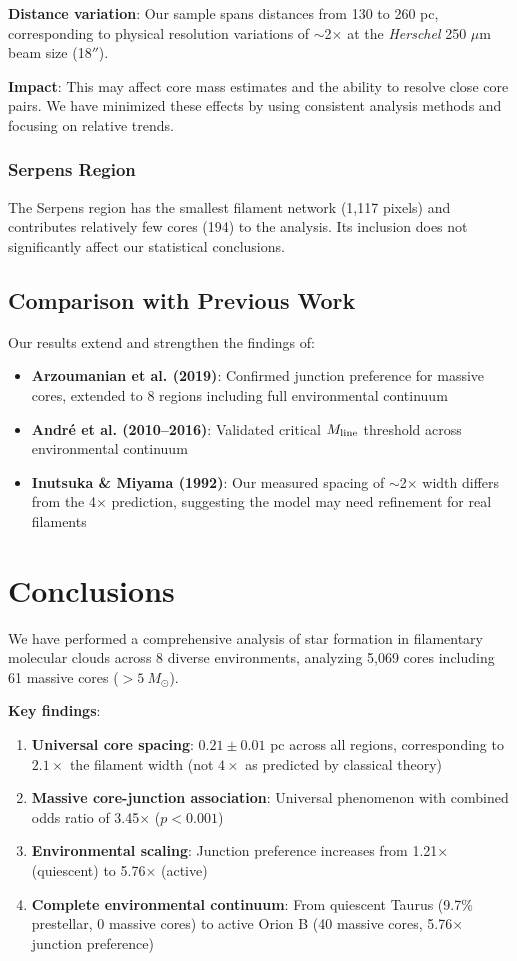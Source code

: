 \documentclass[11pt,a4paper]{article}
\begin{document}
\textbf{Distance variation}: Our sample spans distances from 130 to 260 pc, corresponding to physical resolution variations of $\sim$2$\times$ at the \textit{Herschel} 250 $\mu$m beam size (18$''$).

\textbf{Impact}: This may affect core mass estimates and the ability to resolve close core pairs. We have minimized these effects by using consistent analysis methods and focusing on relative trends.

\subsubsection{Serpens Region}

The Serpens region has the smallest filament network (1,117 pixels) and contributes relatively few cores (194) to the analysis. Its inclusion does not significantly affect our statistical conclusions.

\subsection{Comparison with Previous Work}

Our results extend and strengthen the findings of:
\begin{itemize}
    \item \textbf{Arzoumanian et al. (2019)}: Confirmed junction preference for massive cores, extended to 8 regions including full environmental continuum
    \item \textbf{Andr\'e et al. (2010--2016)}: Validated critical $M_{\rm line}$ threshold across environmental continuum
    \item \textbf{Inutsuka \& Miyama (1992)}: Our measured spacing of $\sim$2× width differs from the 4× prediction, suggesting the model may need refinement for real filaments
\end{itemize}

\section{Conclusions}

We have performed a comprehensive analysis of star formation in filamentary molecular clouds across 8 diverse environments, analyzing 5,069 cores including 61 massive cores ($>5~M_\odot$).

\textbf{Key findings}:
\begin{enumerate}
    \item \textbf{Universal core spacing}: $0.21 \pm 0.01$ pc across all regions, corresponding to $2.1\times$ the filament width (not $4\times$ as predicted by classical theory)
    \item \textbf{Massive core-junction association}: Universal phenomenon with combined odds ratio of 3.45$\times$ ($p < 0.001$)
    \item \textbf{Environmental scaling}: Junction preference increases from 1.21$\times$ (quiescent) to 5.76$\times$ (active)
    \item \textbf{Complete environmental continuum}: From quiescent Taurus (9.7\% prestellar, 0 massive cores) to active Orion B (40 massive cores, 5.76$\times$ junction preference)
\end{enumerate}
\end{document}
